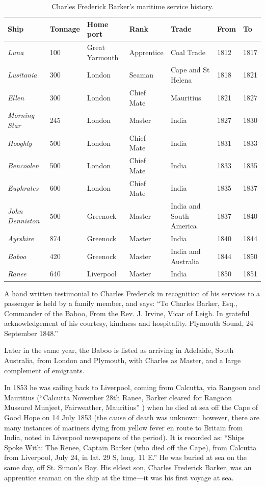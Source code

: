 \begin{table}
\smaller
\begin{tabular}{lllllll}
\toprule
Ship & Tonnage & Home port & Rank & Trade & From & To \\
\midrule
\emph{Luna}           & 100 & Great Yarmouth & Apprentice & Coal Trade & 1812 & 1817 \\
\emph{Lusitania}      & 300 & London         & Seaman     & Cape and St Helena & 1818 & 1821 \\
\emph{Ellen}          & 300 & London         & Chief Mate & Mauritius & 1821 & 1827 \\
\emph{Morning Star}   & 245 & London         & Master     & India & 1827 & 1830 \\
\emph{Hooghly}        & 500 & London         & Chief Mate & India & 1831 & 1833 \\
\emph{Bencoolen}      & 500 & London         & Chief Mate & India & 1833 & 1835 \\
\emph{Euphrates}      & 600 & London         & Chief Mate & India & 1835 & 1837 \\
\emph{John Denniston} & 500 & Greenock       & Master     & India and South America & 1837 & 1840 \\
\emph{Ayrshire}       & 874 & Greenock       & Master     & India & 1840 & 1844 \\
\emph{Baboo}          & 420 & Greenock       & Master     & India and Australia & 1844 & 1850 \\
\emph{Ranee}          & 640 & Liverpool      & Master     & India & 1850 & 1851 \\
\bottomrule
\end{tabular}
\caption{Charles Frederick Barker's maritime service history.\cite{CFBShipList}}
\label{tab:cfb}
\end{table}

A hand written testimonial to Charles Frederick in recognition of his services to a passenger is held by a family member, and says:
``To Charles Barker, Esq., Commander of the Baboo,
From the Rev. J. Irvine, Vicar of Leigh.
In grateful acknowledgement of his courtesy, kindness and hospitality.
Plymouth Sound, 24 September 1848.''

Later in the same year, the Baboo is listed as arriving in Adelaide, South Australia, from London and Plymouth, with Charles as Master, and a large complement of emigrants.\cite{CFBBaboo}

In 1853 he was sailing back to Liverpool, coming from Calcutta, via Rangoon and Mauritius (``Calcutta November 28th Ranee, Barker cleared for Rangoon Mussurel Munjeet, Fairweather, Mauritius'' \cite{CFBRanee}) when he died at sea off the Cape of Good Hope on 14 July 1853 (the cause of death was unknown: however, there are many instances of mariners dying from yellow fever en route to Britain from India, noted in Liverpool newspapers of the period). It is recorded as:
``Ships Spoke With: The Renee, Captain Barker (who died off the Cape), from Calcutta from Liverpool, July 24, in lat. 29 S, long. 11 E.'' \cite{CFBDeath}
He was buried at sea on the same day, off St. Simon's Bay. His eldest son, Charles Frederick Barker, was an apprentice seaman on the ship at the time---it was his first voyage at sea.

